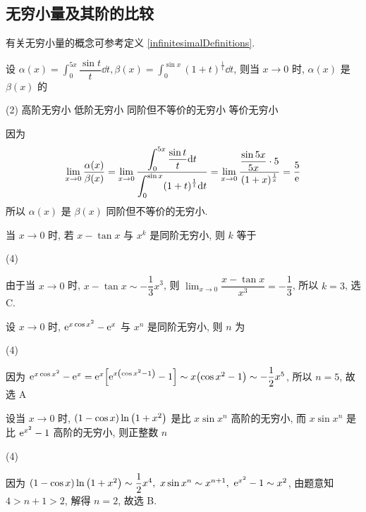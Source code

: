 \subsection{无穷小量及其阶的比较}

有关无穷小量的概念可参考定义 \ref{infinitesimalDefinitions}.

\begin{example}[1999 数二]
    设 $\displaystyle \alpha(x)=\int_{0}^{5x} \dfrac{\sin t}{t} \dd t,\beta(x)=\int_{0}^{\sin x} (1+t)^{\frac{1}{t}} \dd t$, 则当 $x \to0$ 时, $\alpha(x)$ 是 $\beta(x)$ 的 
    \begin{tasks}(2)
        \task 高阶无穷小
        \task 低阶无穷小
        \task 同阶但不等价的无穷小
        \task 等价无穷小
    \end{tasks}
\end{example}
\begin{solution}
    因为 $$
    \lim_{x \to 0}\dfrac{\alpha(x)}{\beta(x)}=\lim_{x \to 0}\dfrac{\displaystyle \int_{0}^{5x} \dfrac{\sin t}{t} \dd t}{\displaystyle \int_{0}^{\sin x} (1+t)^{\frac{1}{t}} \dd t}=\lim_{x \to 0}\dfrac{\dfrac{\sin 5x}{5x}\cdot 5}{(1+x)^{\frac{1}{x}}}=\dfrac{5}{\mathrm{e}}
    $$
    所以 $\alpha(x)$ 是 $\beta(x)$ 同阶但不等价的无穷小.
\end{solution}

\begin{example}[2019 数一]
    当 $x\to0$ 时, 若 $x-\tan x$ 与 $x^{k}$ 是同阶无穷小, 则 $k$ 等于 
    \begin{tasks}(4)
    \end{tasks}
\end{example}
\begin{solution}
    由于当 $x\to0$ 时, $x-\tan x\sim-\dfrac{1}{3}x^3$, 则 $\displaystyle\lim_{x\to0}\dfrac{x-\tan x}{x^3}=-\dfrac{1}{3}$, 所以 $k=3$, 选 C.
\end{solution}

\begin{example}
    设 $x\to0$ 时, $\mathrm{e} ^{x\cos x^2}-\mathrm{e} ^{x}$ 与 $x^n$ 是同阶无穷小, 则 $n $ 为
    \begin{tasks}(4)
    \end{tasks}
\end{example}
\begin{solution}
    因为 $\mathrm{e} ^{x\cos x^2}-\mathrm{e} ^{x}=\mathrm{e}^x\qty[\mathrm{e} ^{x\qty(\cos x^2-1)}-1]\sim x\qty(\cos x^2-1)\sim -\dfrac{1}{2}x^5$, 所以 $n=5$, 故选 A
\end{solution}

\begin{example}[2001 数二]
    设当 $x\to0 $ 时, $(1-\cos x)\ln\qty(1+x^2)$ 是比 $x\sin x^n$ 高阶的无穷小, 而 $x\sin x^n$ 是比 $\mathrm{e} ^{x^2}-1$ 高阶的无穷小, 则正整数 $n$ 
    \begin{tasks}(4)
    \end{tasks}
\end{example}
\begin{solution}
    因为 $(1-\cos x)\ln\qty(1+x^2)\sim\dfrac{1}{2}x^4,~x\sin x^n\sim x^{n+1},~\mathrm{e} ^{x^2}-1\sim x^2$, 由题意知 $4>n+1>2$, 解得 $n=2$, 故选 B.
\end{solution}